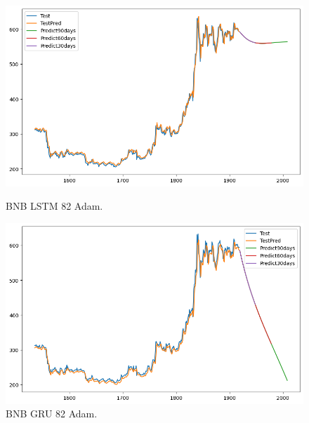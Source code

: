 \documentclass{ieeeojies}
\begin{document}
\begin{figure}[H]
  \centering
  \begin{minipage}{0.48\linewidth}
    \centering
    \includegraphics[width=1\textwidth]{image/BNB_LSTM_82_Adam.png}
    \caption{BNB LSTM 82 Adam.}
  \end{minipage}  
  \hfill
  \begin{minipage}{0.48\linewidth}
    \centering
    \includegraphics[width=1\textwidth]{image/BNB_GRU_82_Adam.png}
    \caption{BNB GRU 82 Adam.}
  \end{minipage}  
\end{figure}
\end{document}
